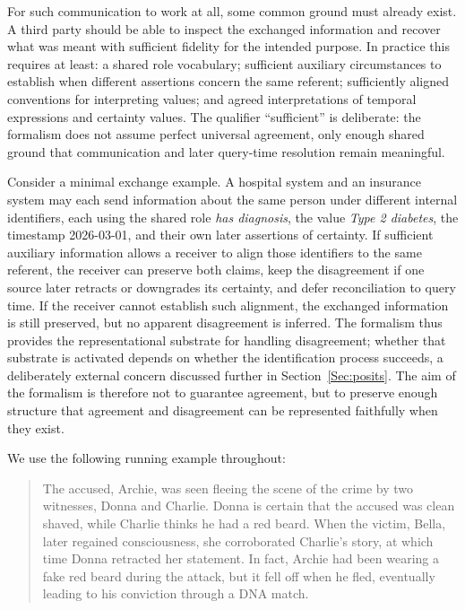 \documentclass[a4paper,fleqn]{cas-sc}
\begin{document}
For such communication to work at all, some common ground must already exist. A third party should be able to inspect the exchanged information and recover what was meant with sufficient fidelity for the intended purpose. In practice this requires at least: a shared role vocabulary; sufficient auxiliary circumstances to establish when different assertions concern the same referent; sufficiently aligned conventions for interpreting values; and agreed interpretations of temporal expressions and certainty values. The qualifier ``sufficient'' is deliberate: the formalism does not assume perfect universal agreement, only enough shared ground that communication and later query-time resolution remain meaningful.

Consider a minimal exchange example. A hospital system and an insurance system may each send information about the same person under different internal identifiers, each using the shared role \textit{has diagnosis}, the value \textit{Type 2 diabetes}, the timestamp 2026-03-01, and their own later assertions of certainty. If sufficient auxiliary information allows a receiver to align those identifiers to the same referent, the receiver can preserve both claims, keep the disagreement if one source later retracts or downgrades its certainty, and defer reconciliation to query time. If the receiver cannot establish such alignment, the exchanged information is still preserved, but no apparent disagreement is inferred. The formalism thus provides the representational substrate for handling disagreement; whether that substrate is activated depends on whether the identification process succeeds, a deliberately external concern discussed further in Section~\ref{Sec:posits}. The aim of the formalism is therefore not to guarantee agreement, but to preserve enough structure that agreement and disagreement can be represented faithfully when they exist.

We use the following running example throughout:
\begin{quote}
\small
The accused, Archie, was seen fleeing the scene of the crime by two witnesses, Donna and Charlie. Donna is certain that the accused was clean shaved, while Charlie thinks he had a red beard. When the victim, Bella, later regained consciousness, she corroborated Charlie's story, at which time Donna retracted her statement. In fact, Archie had been wearing a fake red beard during the attack, but it fell off when he fled, eventually leading to his conviction through a DNA match.
\end{quote}
\end{document}
